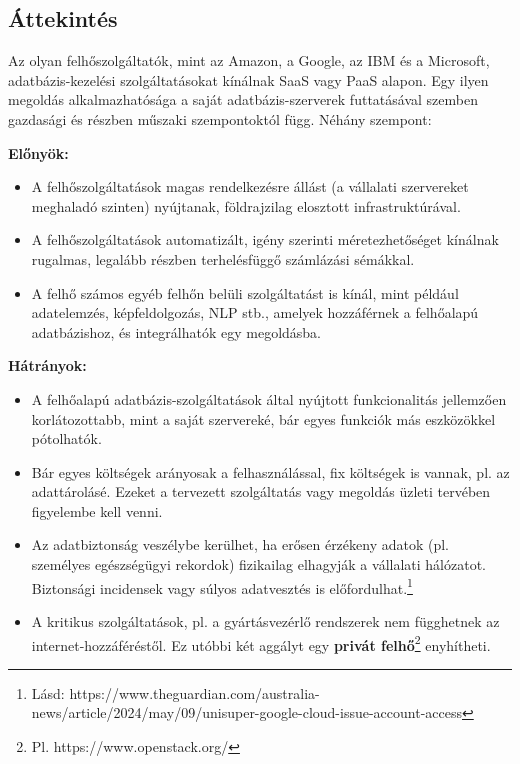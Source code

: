 \documentclass[
  magyar,
]{article}
\providecommand{\tightlist}{%
  \setlength{\itemsep}{0pt}\setlength{\parskip}{0pt}}
\begin{document}
\subsection{Áttekintés}\label{uxe1ttekintuxe9s}

Az olyan felhőszolgáltatók, mint az Amazon, a Google, az IBM és a
Microsoft, adatbázis-kezelési szolgáltatásokat kínálnak SaaS vagy PaaS
alapon. Egy ilyen megoldás alkalmazhatósága a saját adatbázis-szerverek
futtatásával szemben gazdasági és részben műszaki szempontoktól függ.
Néhány szempont:

\textbf{Előnyök:}

\begin{itemize}
\tightlist
\item
  A felhőszolgáltatások magas rendelkezésre állást (a vállalati
  szervereket meghaladó szinten) nyújtanak, földrajzilag elosztott
  infrastruktúrával.
\item
  A felhőszolgáltatások automatizált, igény szerinti méretezhetőséget
  kínálnak rugalmas, legalább részben terhelésfüggő számlázási sémákkal.
\item
  A felhő számos egyéb felhőn belüli szolgáltatást is kínál, mint
  például adatelemzés, képfeldolgozás, NLP stb., amelyek hozzáférnek a
  felhőalapú adatbázishoz, és integrálhatók egy megoldásba.
\end{itemize}

\textbf{Hátrányok:}

\begin{itemize}
\tightlist
\item
  A felhőalapú adatbázis-szolgáltatások által nyújtott funkcionalitás
  jellemzően korlátozottabb, mint a saját szervereké, bár egyes funkciók
  más eszközökkel pótolhatók.
\item
  Bár egyes költségek arányosak a felhasználással, fix költségek is
  vannak, pl. az adattárolásé. Ezeket a tervezett szolgáltatás vagy
  megoldás üzleti tervében figyelembe kell venni.
\item
  Az adatbiztonság veszélybe kerülhet, ha erősen érzékeny adatok (pl.
  személyes egészségügyi rekordok) fizikailag elhagyják a vállalati
  hálózatot. Biztonsági incidensek vagy súlyos adatvesztés is
  előfordulhat.\footnote{Lásd:
    https://www.theguardian.com/australia-news/article/2024/may/09/unisuper-google-cloud-issue-account-access}
\item
  A kritikus szolgáltatások, pl. a gyártásvezérlő rendszerek nem
  függhetnek az internet-hozzáféréstől. Ez utóbbi két aggályt egy
  \textbf{privát felhő}\footnote{Pl. https://www.openstack.org/}
  enyhítheti.
\end{itemize}
\end{document}
